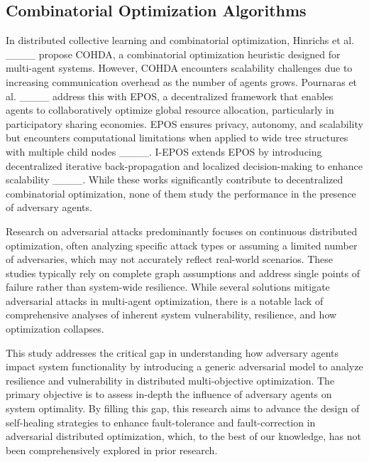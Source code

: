 \subsection{Combinatorial Optimization Algorithms}
In distributed collective learning and combinatorial optimization, Hinrichs et al. ____ propose COHDA, a combinatorial optimization heuristic designed for multi-agent systems. However, COHDA encounters scalability challenges due to increasing communication overhead as the number of agents grows. Pournaras et al. ____ address this with EPOS,
a decentralized framework that enables agents to collaboratively optimize global resource allocation, particularly in participatory sharing economies. EPOS ensures privacy, autonomy, and scalability but encounters computational limitations when applied to wide tree structures with multiple child nodes ____. I-EPOS extends EPOS by introducing decentralized iterative back-propagation and localized decision-making to enhance scalability ____. While these works significantly contribute to decentralized combinatorial optimization, none of them study the performance in the presence of adversary agents.

Research on adversarial attacks predominantly focuses on continuous distributed optimization, often analyzing specific attack types or assuming a limited number of adversaries, which may not accurately reflect real-world scenarios. These studies typically rely on complete graph assumptions and address single points of failure rather than system-wide resilience. While several solutions mitigate adversarial attacks in multi-agent optimization, there is a notable lack of comprehensive analyses of inherent system vulnerability, resilience, and how optimization collapses.

This study addresses the critical gap in understanding how adversary agents impact system functionality by introducing a generic adversarial model to analyze resilience and vulnerability in distributed multi-objective optimization. The primary objective is to assess in-depth the influence of adversary agents on system optimality. By filling this gap, this research aims to advance the design of self-healing strategies to enhance fault-tolerance and fault-correction in adversarial distributed optimization, which, to the best of our knowledge, has not been comprehensively explored in prior research.